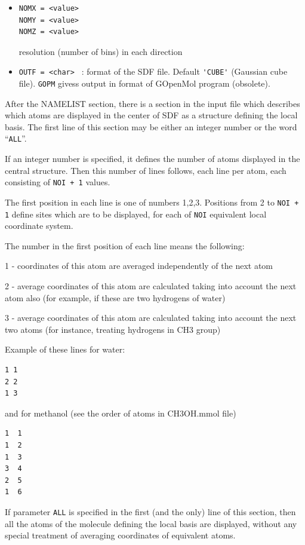 \documentclass{article}
\begin{document}
\begin{itemize}
\item
\begin{verbatim}
NOMX = <value> 
NOMY = <value> 
NOMZ = <value> 
\end{verbatim}
resolution (number of bins) in each direction

\item
  \verb|OUTF = <char> |  : format of the SDF  file. Default \verb|'CUBE'|
  (Gaussian cube file). \verb|GOPM| givess output in format of
  GOpenMol program (obsolete).

\end{itemize}

After the NAMELIST section, there is a section in the input file 
which describes which atoms are displayed in the center of SDF as
a structure defining the local basis. 
The first line of this section may be either an integer number or
the word ``\verb|ALL|''. 

If an integer number is specified, it defines the number of atoms
displayed in the central structure. Then this number of lines follows,
each line per atom, each consisting of \verb|NOI + 1| values.

The first position in each line is one of numbers 1,2,3.
Positions from 2 to \verb|NOI + 1| define sites which are to be displayed,
for each of \verb|NOI| equivalent local coordinate system.

The number in the first position of each line means the following:

1 - coordinates of this atom are averaged independently of the next atom

2 - average coordinates of this atom are calculated taking into account
the next atom also (for example, if these are two hydrogens of water)

3 - average coordinates of this atom are calculated taking into account
the next two atoms (for instance, treating hydrogens in CH3 group)

Example of these lines for water:
\begin{verbatim}
1 1
2 2 
1 3
\end{verbatim}

and for methanol (see the order of atoms in CH3OH.mmol file)

\begin{verbatim}
1  1
1  2
1  3
3  4
2  5
1  6
\end{verbatim}
 
If parameter \verb|ALL| is specified in the first (and the only) line of 
this section, then all the atoms of the molecule defining the local basis 
are displayed, without any special treatment of averaging coordinates of 
equivalent atoms.
\end{document}
